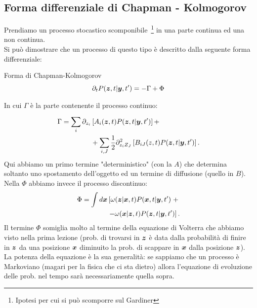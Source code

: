 \subsection{Forma differenziale di Chapman - Kolmogorov}%
\label{sub:Forma differenziale di Chapman - Kolmogorov}
Prendiamo un processo stocastico scomponibile\
\footnote{Ipotesi per cui si può scomporre sul Gardiner}  in una parte continua ed una non continua.\\
Si può dimostrare che un processo di questo tipo è descritto dalla seguente forma differenziale:
\begin{redbox}{Forma di Chapman-Kolmogorov}
    \begin{equation}
    \partial_{t}P(\boldsymbol{z},t| \boldsymbol{y}, t') = - \Gamma + \Phi
    \label{eq:4_CK}
    \end{equation}
\end{redbox}
\noindent
In cui $\Gamma$ è la parte contenente il processo continuo:
\[\begin{aligned}
    \Gamma = \sum_{i}^{} \partial_{z_i}&\left[ A_i(\boldsymbol{z},t) P(\boldsymbol{z},t|\boldsymbol{y},t') \right] +\\
                         &+\sum_{i,J}^{} \frac{1}{2}\partial^2_{z_iZ_J}\left[ B_{iJ}(z,t) P(\boldsymbol{z},t|\boldsymbol{y},t') \right]
.\end{aligned}\]
Qui abbiamo un primo termine "deterministico" (con la $A$) che determina soltanto uno spostamento dell'oggetto ed un termine di diffusione (quello in $B$).\\
Nella $\Phi$ abbiamo invece il processo discontinuo:
\[\begin{aligned}
    \Phi = \int  d\boldsymbol{x} &\left[\omega (\boldsymbol{z}|\boldsymbol{x}, t) P(\boldsymbol{x},t|\boldsymbol{y}, t') \right. + \\
			   & \left. - \omega(\boldsymbol{x} | \boldsymbol{z}, t)  P(\boldsymbol{z},t|\boldsymbol{y},t') \right]
.\end{aligned}\]
Il termine $\Phi$ somiglia molto al termine della equazione di Volterra che abbiamo visto nella prima lezione (prob. di trovarsi in $\boldsymbol{z}$ è data dalla probabilità di finire in $\boldsymbol{z}$ da una posizione $\boldsymbol{x}$ diminuito la prob. di scappare in $\boldsymbol{x}$ dalla posizione $\boldsymbol{z}$).\\
La potenza della equazione è la sua generalità: se sappiamo che un processo è Markoviano (magari per la fisica che ci sta dietro) allora l'equazione di evoluzione delle prob. nel tempo sarà necessariamente quella sopra.
